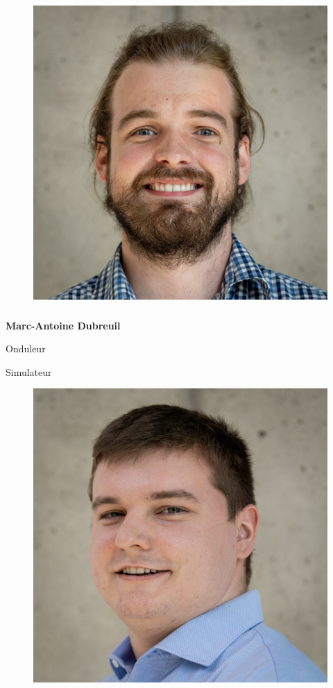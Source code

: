 \documentclass[a0paper,portrait]{baposter}
\begin{document}
\begin{poster}
{\begin{figure}
\includegraphics[width=.9\linewidth]{img/membres/Marc-Antoine-Dubreuil-2.jpg} 
\end{figure}
\subsubsection*{}
\textbf{Marc-Antoine Dubreuil}

Onduleur

Simulateur

\begin{figure}
\includegraphics[width=.9\linewidth]{img/membres/Thomas-Chagnon-3.jpg} 
\end{figure}
}
\end{poster}
\end{document}
